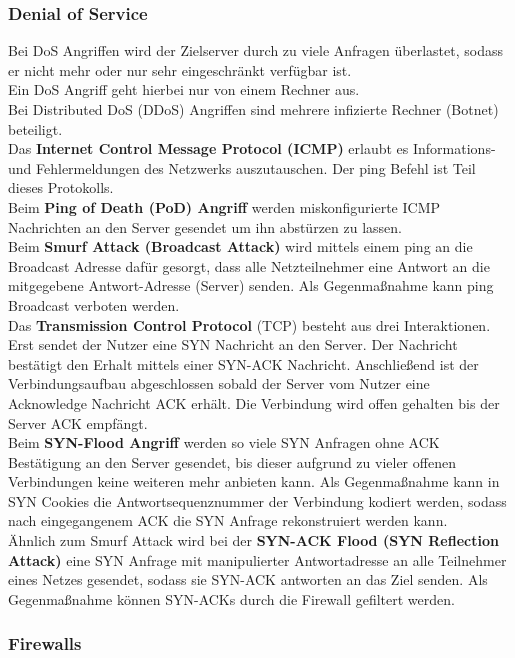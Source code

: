 \documentclass[a4paper,12pt,leqno]{article}
\begin{document}
\subsubsection{Denial of Service}

Bei DoS Angriffen wird der Zielserver durch zu viele Anfragen überlastet, sodass er nicht mehr oder nur sehr eingeschränkt verfügbar ist.\\
Ein DoS Angriff geht hierbei nur von einem Rechner aus.\\
Bei Distributed DoS (DDoS) Angriffen sind mehrere infizierte Rechner (Botnet) beteiligt.\\

Das \textbf{Internet Control Message Protocol (ICMP)} erlaubt es Informations- und Fehlermeldungen des Netzwerks auszutauschen. Der ping Befehl ist Teil dieses Protokolls.\\
Beim \textbf{Ping of Death (PoD) Angriff} werden miskonfigurierte ICMP Nachrichten an den Server gesendet um ihn abstürzen zu lassen.\\
Beim \textbf{Smurf Attack (Broadcast Attack)} wird mittels einem ping an die Broadcast Adresse dafür gesorgt, dass alle Netzteilnehmer eine Antwort an die mitgegebene Antwort-Adresse (Server) senden. Als Gegenmaßnahme kann ping Broadcast verboten werden.\\

Das \textbf{Transmission Control Protocol} (TCP) besteht aus drei Interaktionen. Erst sendet der Nutzer eine SYN Nachricht an den Server. Der Nachricht bestätigt den Erhalt mittels einer SYN-ACK Nachricht. Anschließend ist der Verbindungsaufbau abgeschlossen sobald der Server vom Nutzer eine Acknowledge Nachricht ACK erhält.
Die Verbindung wird offen gehalten bis der Server ACK empfängt.\\
Beim \textbf{SYN-Flood Angriff} werden so viele SYN Anfragen ohne ACK Bestätigung an den Server gesendet, bis dieser aufgrund zu vieler offenen Verbindungen keine weiteren mehr anbieten kann. Als Gegenmaßnahme kann in SYN Cookies die Antwortsequenznummer der Verbindung kodiert werden, sodass nach eingegangenem ACK die SYN Anfrage rekonstruiert werden kann.\\
Ähnlich zum Smurf Attack wird bei der \textbf{SYN-ACK Flood (SYN Reflection Attack)} eine SYN Anfrage mit manipulierter Antwortadresse an alle Teilnehmer eines Netzes gesendet, sodass sie SYN-ACK antworten an das Ziel senden. Als Gegenmaßnahme können SYN-ACKs durch die Firewall gefiltert werden.

\subsubsection{Firewalls} 
\end{document}
